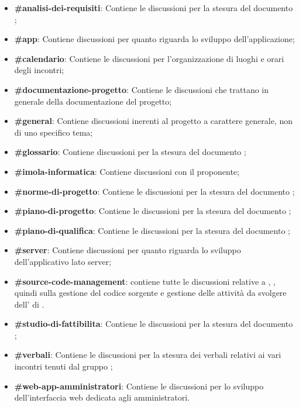 \begin{itemize}
	\item \textbf{\#analisi-dei-requisiti}: Contiene le discussioni per la stesura del documento \AdR{};
	\item \textbf{\#app}: Contiene discussioni per quanto riguarda lo sviluppo dell'applicazione;
	\item \textbf{\#calendario}: Contiene le discussioni per l’organizzazione di luoghi e orari degli incontri;
	\item \textbf{\#documentazione-progetto}: Contiene le discussioni che trattano in generale della documentazione del progetto;
	\item \textbf{\#general}: Contiene discussioni inerenti al progetto a carattere generale, non di uno specifico tema;
	\item \textbf{\#glossario}: Contiene discussioni per la stesura del documento \Glossario{};
	\item \textbf{\#imola-informatica}: Contiene discussioni con il proponente;
	\item \textbf{\#norme-di-progetto}: Contiene le discussioni per la stesura del documento \NdP{};
    \item \textbf{\#piano-di-progetto}: Contiene le discussioni per la stesura del documento \PdP{};
	\item \textbf{\#piano-di-qualifica}: Contiene le discussioni per la stesura del documento \PdQ{};
	\item \textbf{\#server}: Contiene discussioni per quanto riguarda lo sviluppo dell'applicativo lato server;
	\item \textbf{\#source-code-management}: contiene tutte le discussioni relative a , , quindi sulla gestione del codice sorgente e gestione delle attività da svolgere dell' di .
	\item \textbf{\#studio-di-fattibilita}: Contiene le discussioni per la stesura del documento \SdF{};
	\item \textbf{\#verbali}: Contiene le discussioni per la stesura dei verbali relativi ai vari incontri tenuti dal gruppo \Gruppo{};
	\item \textbf{\#web-app-amministratori}: Contiene le discussioni per lo sviluppo dell'interfaccia web dedicata agli amministratori.
\end{itemize}

